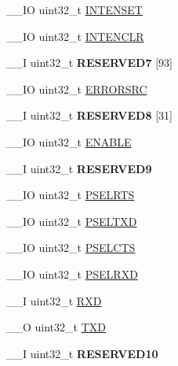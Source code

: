 \begin{DoxyCompactItemize}
\item 
\+\_\+\+\_\+\+I\+O uint32\+\_\+t \hyperlink{struct_n_r_f___u_a_r_t___type_a1e32a26cb7bd217f6c01212df3ef6d17}{I\+N\+T\+E\+N\+S\+E\+T}
\item 
\+\_\+\+\_\+\+I\+O uint32\+\_\+t \hyperlink{struct_n_r_f___u_a_r_t___type_a85f609b195f7387ea5bd67b1092e3d71}{I\+N\+T\+E\+N\+C\+L\+R}
\item 
\hypertarget{struct_n_r_f___u_a_r_t___type_ac0170bbc8b6b57eb54e7e618085e8ab7}{}\+\_\+\+\_\+\+I uint32\+\_\+t {\bfseries R\+E\+S\+E\+R\+V\+E\+D7} \mbox{[}93\mbox{]}\label{struct_n_r_f___u_a_r_t___type_ac0170bbc8b6b57eb54e7e618085e8ab7}

\item 
\+\_\+\+\_\+\+I\+O uint32\+\_\+t \hyperlink{struct_n_r_f___u_a_r_t___type_a1766d7ede20997bafc2daac6c490a75c}{E\+R\+R\+O\+R\+S\+R\+C}
\item 
\hypertarget{struct_n_r_f___u_a_r_t___type_aabc76ae542e30636a9205c27980b018c}{}\+\_\+\+\_\+\+I uint32\+\_\+t {\bfseries R\+E\+S\+E\+R\+V\+E\+D8} \mbox{[}31\mbox{]}\label{struct_n_r_f___u_a_r_t___type_aabc76ae542e30636a9205c27980b018c}

\item 
\+\_\+\+\_\+\+I\+O uint32\+\_\+t \hyperlink{struct_n_r_f___u_a_r_t___type_a0f73eba7bb0d82801b4729fab81ab5a5}{E\+N\+A\+B\+L\+E}
\item 
\hypertarget{struct_n_r_f___u_a_r_t___type_a91b98634b3324be23de91cf1cf389221}{}\+\_\+\+\_\+\+I uint32\+\_\+t {\bfseries R\+E\+S\+E\+R\+V\+E\+D9}\label{struct_n_r_f___u_a_r_t___type_a91b98634b3324be23de91cf1cf389221}

\item 
\+\_\+\+\_\+\+I\+O uint32\+\_\+t \hyperlink{struct_n_r_f___u_a_r_t___type_aea4dea06256fc25c674f7dc1c43101da}{P\+S\+E\+L\+R\+T\+S}
\item 
\+\_\+\+\_\+\+I\+O uint32\+\_\+t \hyperlink{struct_n_r_f___u_a_r_t___type_ac0141eb47b1d90be88be2ea362027c52}{P\+S\+E\+L\+T\+X\+D}
\item 
\+\_\+\+\_\+\+I\+O uint32\+\_\+t \hyperlink{struct_n_r_f___u_a_r_t___type_a922cddfb36ed01525c240d3f5dfcd8d3}{P\+S\+E\+L\+C\+T\+S}
\item 
\+\_\+\+\_\+\+I\+O uint32\+\_\+t \hyperlink{struct_n_r_f___u_a_r_t___type_a617a959d13ab9140c53c1abe81c8ddee}{P\+S\+E\+L\+R\+X\+D}
\item 
\+\_\+\+\_\+\+I uint32\+\_\+t \hyperlink{struct_n_r_f___u_a_r_t___type_a6cbf8161d52614c32ffc068b09870fb5}{R\+X\+D}
\item 
\+\_\+\+\_\+\+O uint32\+\_\+t \hyperlink{struct_n_r_f___u_a_r_t___type_a08b4d917f98a24a8907abdca02c8418a}{T\+X\+D}
\item 
\hypertarget{struct_n_r_f___u_a_r_t___type_a4c688b1e6251ad92c50075ea41b446e2}{}\+\_\+\+\_\+\+I uint32\+\_\+t {\bfseries R\+E\+S\+E\+R\+V\+E\+D10}\label{struct_n_r_f___u_a_r_t___type_a4c688b1e6251ad92c50075ea41b446e2}


\end{DoxyCompactItemize}
